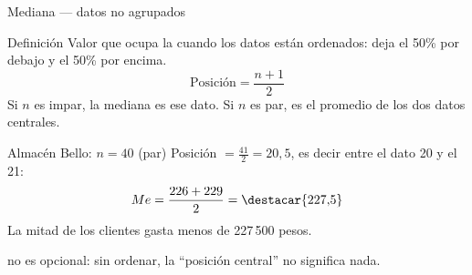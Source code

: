 \documentclass[aspectratio=169,10pt]{beamer}
\begin{document}
\begin{frame}{Mediana — datos no agrupados}
  \footnotesize
  \begin{block}{Definición}
    \scriptsize
    Valor que ocupa la  cuando los datos están
    ordenados: deja el 50\% por debajo y el 50\% por encima.
    \vspace{0.1cm}
    \[ \text{Posición} = \frac{n+1}{2} \]
    Si $n$ es impar, la mediana es ese dato. Si $n$ es par, es el promedio de
    los dos datos centrales.
  \end{block}

  \vspace{0.1cm}
  \begin{exampleblock}{Almacén Bello: $n = 40$ (par)}
    \scriptsize
    Posición $= \frac{41}{2} = 20{,}5$, es decir entre el dato 20 y el 21:
    \[ Me = \frac{226 + 229}{2} = \destacar{227{,}5} \]
    La mitad de los clientes gasta menos de 227\,500 pesos.
  \end{exampleblock}

  \vspace{0.05cm}
  {\tiny\color{uniGris}  no es opcional: sin ordenar,
  la ``posición central'' no significa nada.}
\end{frame}
\end{document}
